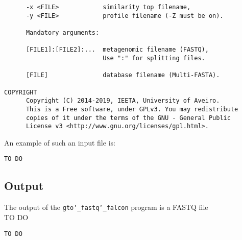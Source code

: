 \begin{lstlisting}
      -x <FILE>            similarity top filename,                      
      -y <FILE>            profile filename (-Z must be on).             
                                                                         
      Mandatory arguments:                                               
                                                                         
      [FILE1]:[FILE2]:...  metagenomic filename (FASTQ),                 
                           Use ":" for splitting files.                
                                                                         
      [FILE]               database filename (Multi-FASTA).              
                                                                         
COPYRIGHT                                                                
      Copyright (C) 2014-2019, IEETA, University of Aveiro.              
      This is a Free software, under GPLv3. You may redistribute         
      copies of it under the terms of the GNU - General Public           
      License v3 <http://www.gnu.org/licenses/gpl.html>.    
\end{lstlisting}
An example of such an input file is:
\begin{lstlisting}
TO DO
\end{lstlisting}

\subsection*{Output}
The output of the \texttt{gto\char`_fastq\char`_falcon} program is a FASTQ file\\
TO DO
\begin{lstlisting}
TO DO
\end{lstlisting}